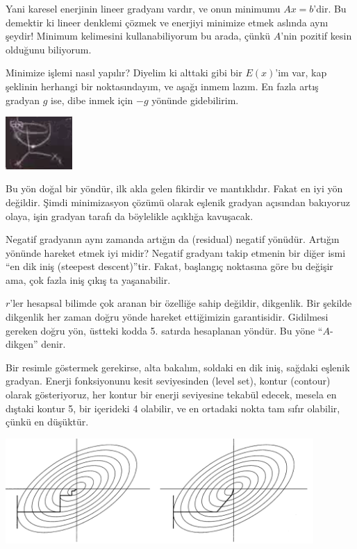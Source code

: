 \documentclass[12pt,fleqn]{article}\usepackage{../../common}
\begin{document}
Yani karesel enerjinin lineer gradyanı vardır, ve onun minimumu $Ax = b$'dir. Bu
demektir ki lineer denklemi çözmek ve enerjiyi minimize etmek aslında aynı
şeydir! Minimum kelimesini kullanabiliyorum bu arada, çünkü $A$'nin pozitif
kesin olduğunu biliyorum.

Minimize işlemi nasıl yapılır? Diyelim ki alttaki gibi bir $E(x)$'im var,
kap şeklinin herhangi bir noktasındayım, ve aşağı inmem lazım. En fazla
artış gradyan $g$ ise, dibe inmek için $-g$ yönünde gidebilirim. 

\includegraphics[height=2cm]{19_1.png}

Bu yön doğal bir yöndür, ilk akla gelen fikirdir ve mantıklıdır. Fakat en
iyi yön değildir. Şimdi minimizasyon çözümü olarak eşlenik gradyan
açısından bakıyoruz olaya, işin gradyan tarafı da böylelikle açıklığa
kavuşacak. 

Negatif gradyanın aynı zamanda artığın da (residual) negatif
yönüdür. Artığın yönünde hareket etmek iyi midir? Negatif gradyanı takip
etmenin bir diğer ismi ``en dik iniş (steepest descent)''tir. Fakat,
başlangıç noktasına göre bu değişir ama, çok fazla iniş çıkış ta
yaşanabilir.

$r$'ler hesapsal bilimde çok aranan bir özelliğe sahip değildir,
dikgenlik. Bir şekilde dikgenlik her zaman doğru yönde hareket
ettiğimizin garantisidir. Gidilmesi gereken doğru yön, üstteki kodda
5. satırda hesaplanan yöndür. Bu yöne ``$A$-dikgen'' denir. 

Bir resimle göstermek gerekirse, alta bakalım, soldaki en dik iniş, sağdaki
eşlenik gradyan. Enerji fonksiyonunu kesit seviyesinden (level set), kontur
(contour) olarak gösteriyoruz, her kontur bir enerji seviyesine tekabül edecek,
mesela en dıştaki kontur 5, bir içerideki 4 olabilir, ve en ortadaki nokta tam
sıfır olabilir, çünkü en düşüktür.

\includegraphics[height=4cm]{19_2.png}
\end{document}
